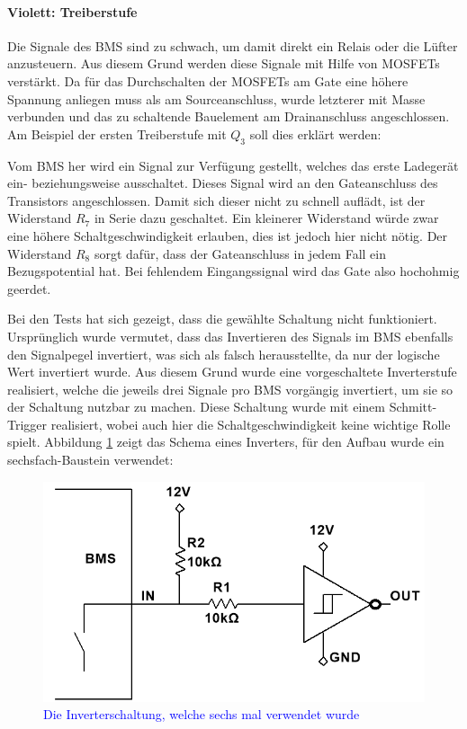 \paragraph{Violett: Treiberstufe}
Die Signale des BMS sind zu schwach, um damit direkt ein Relais oder die Lüfter anzusteuern. Aus diesem Grund werden diese Signale mit Hilfe von MOSFETs verstärkt. Da für das Durchschalten der MOSFETs am Gate eine höhere Spannung anliegen muss als am Sourceanschluss, wurde letzterer mit Masse verbunden und das zu schaltende Bauelement am Drainanschluss angeschlossen. Am Beispiel der ersten Treiberstufe mit $Q_3$ soll dies erklärt werden:

Vom BMS her wird ein Signal zur Verfügung gestellt, welches das erste Ladegerät ein- beziehungsweise ausschaltet. Dieses Signal wird an den Gateanschluss des Transistors angeschlossen. Damit sich dieser nicht zu schnell auflädt, ist der Widerstand $R_7$ in Serie dazu geschaltet. Ein kleinerer Widerstand würde zwar eine höhere Schaltgeschwindigkeit erlauben, dies ist jedoch hier nicht nötig. Der Widerstand $R_8$ sorgt dafür, dass der Gateanschluss in jedem Fall ein Bezugspotential hat. Bei fehlendem Eingangssignal wird das Gate also hochohmig geerdet.

\color{blue}
Bei den Tests hat sich gezeigt, dass die gewählte Schaltung nicht funktioniert. Ursprünglich wurde vermutet, dass das Invertieren des Signals im BMS ebenfalls den Signalpegel invertiert, was sich als falsch herausstellte, da nur der logische Wert invertiert wurde. Aus diesem Grund wurde eine vorgeschaltete Inverterstufe realisiert, welche die jeweils drei Signale pro BMS vorgängig invertiert, um sie so der Schaltung nutzbar zu machen. Diese Schaltung wurde mit einem Schmitt-Trigger realisiert, wobei auch hier die Schaltgeschwindigkeit keine wichtige Rolle spielt. Abbildung \ref{fig:Inverter} zeigt das Schema eines Inverters, für den Aufbau wurde ein sechsfach-Baustein verwendet:

\begin{figure}[h]
	\centering
		\includegraphics[width=.60\textwidth]{images/Inverter.png}
	\caption{\textcolor{blue}{Die Inverterschaltung, welche sechs mal verwendet wurde}}
	\label{fig:Inverter}
\end{figure}
\color{black}

